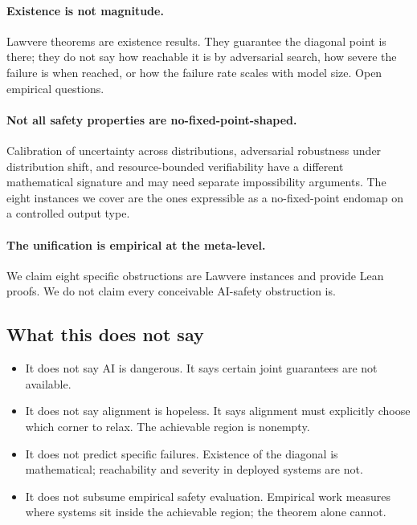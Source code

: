 \paragraph{Existence is not magnitude.}
Lawvere theorems are existence results. They guarantee the diagonal point is there; they do not say how reachable it is by adversarial search, how severe the failure is when reached, or how the failure rate scales with model size. Open empirical questions.

\paragraph{Not all safety properties are no-fixed-point-shaped.}
Calibration of uncertainty across distributions, adversarial robustness under distribution shift, and resource-bounded verifiability have a different mathematical signature and may need separate impossibility arguments. The eight instances we cover are the ones expressible as a no-fixed-point endomap on a controlled output type.

\paragraph{The unification is empirical at the meta-level.}
We claim eight specific obstructions are Lawvere instances and provide Lean proofs. We do not claim every conceivable AI-safety obstruction is.

\subsection{What this does not say}
\label{sec:what-it-does-not-say}

\begin{itemize}\itemsep1pt
\item It does not say AI is dangerous. It says certain joint guarantees are not available.
\item It does not say alignment is hopeless. It says alignment must explicitly choose which corner to relax. The achievable region is nonempty.
\item It does not predict specific failures. Existence of the diagonal is mathematical; reachability and severity in deployed systems are not.
\item It does not subsume empirical safety evaluation. Empirical work measures where systems sit inside the achievable region; the theorem alone cannot.
\end{itemize}

